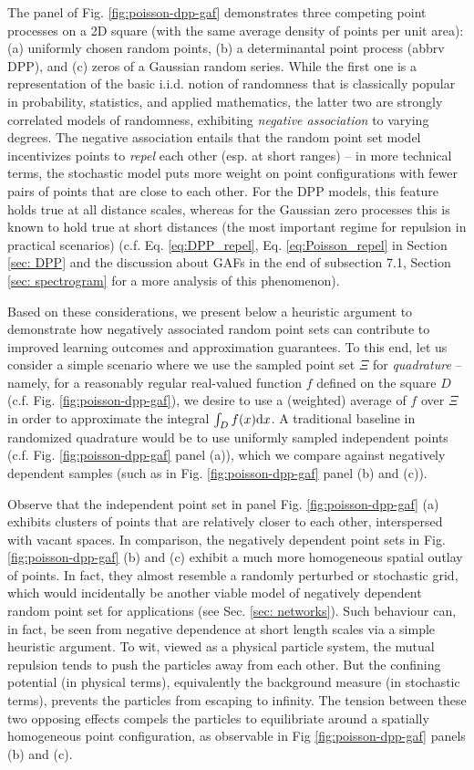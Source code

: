 The panel of Fig. \ref{fig:poisson-dpp-gaf} demonstrates three competing point processes on a 2D square (with the same average density of points per unit area): (a) uniformly chosen random points, (b) a determinantal point process (abbrv DPP), and (c) zeros of a Gaussian random series. While the first one is a representation of the basic i.i.d. notion of randomness that is classically popular in probability, statistics, and applied mathematics, the latter two are strongly correlated models of randomness, exhibiting \textit{negative association} to varying degrees. The negative association entails that the random point set model incentivizes points to \textit{repel} each other (esp. at short ranges) -- in more technical terms, the stochastic model puts more weight on point configurations with fewer pairs of points that are close to each other. For the DPP models, this feature holds true at all distance scales, whereas for the Gaussian zero processes this is known to hold true at short distances (the most important regime for repulsion in practical scenarios) (c.f. Eq. \ref{eq:DPP_repel}, Eq. \ref{eq:Poisson_repel} in Section \ref{sec: DPP} and the discussion about GAFs in the end of subsection 7.1, Section \ref{sec: spectrogram} for a more analysis of this phenomenon). 


Based on these considerations, we present below a heuristic argument to demonstrate how negatively associated random point sets can contribute to improved learning outcomes and approximation guarantees. To this end, let us consider a simple scenario where we use the sampled point set $\Xi$ for \textit{quadrature} -- namely, for a reasonably regular real-valued function $f$ defined on the square $D$ (c.f. Fig. \ref{fig:poisson-dpp-gaf}), we desire to use a (weighted) average of $f$ over $\Xi$ in order to approximate the integral $\int_D f(x) \mathrm{d} x$. A traditional baseline in randomized quadrature would be to use uniformly sampled independent points (c.f. Fig. \ref{fig:poisson-dpp-gaf} panel (a)), which we compare against negatively dependent samples (such as in Fig. \ref{fig:poisson-dpp-gaf} panel (b) and (c)). 

Observe that the independent point set in panel Fig. \ref{fig:poisson-dpp-gaf} (a) exhibits clusters of points that are relatively closer to each other, interspersed with vacant spaces. In comparison, the negatively dependent point sets in Fig. \ref{fig:poisson-dpp-gaf} (b) and (c) exhibit a much more homogeneous spatial outlay of points. In fact, they almost resemble a randomly perturbed or stochastic grid, which would incidentally be another viable model of negatively dependent random point set for applications (see Sec. \ref{sec: networks}). Such behaviour can, in fact, be seen from negative dependence at short length scales via a simple heuristic argument. To wit, viewed as a physical particle system, the mutual repulsion tends to push the particles away from each other. But the confining potential (in physical terms), equivalently the background measure (in stochastic terms), prevents the particles from escaping to infinity. The tension between these two opposing effects compels the particles to equilibriate around a spatially homogeneous point configuration, as observable in Fig \ref{fig:poisson-dpp-gaf} panels (b) and (c).


